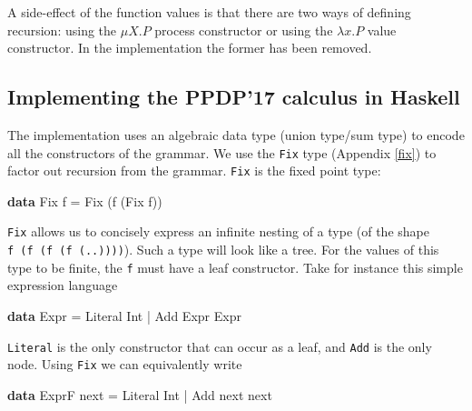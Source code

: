 \documentclass[runningheads,plain]{llncs}
\newenvironment{Shaded}{}{}
\newcommand{\KeywordTok}[1]{\textcolor[rgb]{0.00,0.44,0.13}{\textbf{#1}}}
\newcommand{\DataTypeTok}[1]{\textcolor[rgb]{0.56,0.13,0.00}{#1}}
\newcommand{\FunctionTok}[1]{\textcolor[rgb]{0.02,0.16,0.49}{#1}}
\newcommand{\NormalTok}[1]{#1}
\begin{document}
A side-effect of the function values is that there are two ways of
defining recursion: using the \(\mu X.P\) process constructor or using
the \(\lambda x.P\) value constructor. In the implementation the former
has been removed.

\subsection{Implementing the PPDP'17 calculus in
Haskell}\label{implementing-the-ppdp17-calculus-in-haskell}

The implementation uses an algebraic data type (union type/sum type) to
encode all the constructors of the grammar. We use the \texttt{Fix} type
(Appendix \ref{fix}) to factor out recursion from the grammar.
\texttt{Fix} is the fixed point type:

\begin{Shaded}
\begin{Highlighting}[]
\KeywordTok{data} \DataTypeTok{Fix}\NormalTok{ f }\FunctionTok{=} \DataTypeTok{Fix}\NormalTok{ (f (}\DataTypeTok{Fix}\NormalTok{ f))}
\end{Highlighting}
\end{Shaded}

\texttt{Fix} allows us to concisely express an infinite nesting of a
type (of the shape \texttt{f\ (f\ (f\ (f\ (..))))}). Such a type will
look like a tree. For the values of this type to be finite, the
\texttt{f} must have a leaf constructor. Take for instance this simple
expression language

\begin{Shaded}
\begin{Highlighting}[]
\KeywordTok{data} \DataTypeTok{Expr}
    \FunctionTok{=} \DataTypeTok{Literal} \DataTypeTok{Int}
    \FunctionTok{|} \DataTypeTok{Add} \DataTypeTok{Expr} \DataTypeTok{Expr} 
\end{Highlighting}
\end{Shaded}

\texttt{Literal} is the only constructor that can occur as a leaf, and
\texttt{Add} is the only node. Using \texttt{Fix} we can equivalently
write

\begin{Shaded}
\begin{Highlighting}[]
\KeywordTok{data} \DataTypeTok{ExprF}\NormalTok{ next}
    \FunctionTok{=} \DataTypeTok{Literal} \DataTypeTok{Int}
    \FunctionTok{|} \DataTypeTok{Add}\NormalTok{ next next }
\end{Highlighting}
\end{Shaded}
\end{document}
